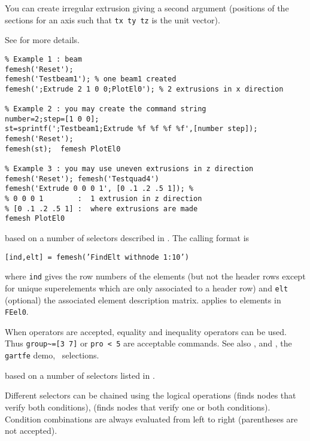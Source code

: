 You can create irregular extrusion giving a second argument (positions of the sections for an axis such that {\tt tx ty tz} is the unit vector).

See  for more details.

\begin{verbatim}
% Example 1 : beam
femesh('Reset');
femesh('Testbeam1'); % one beam1 created
femesh(';Extrude 2 1 0 0;PlotEl0'); % 2 extrusions in x direction

% Example 2 : you may create the command string
number=2;step=[1 0 0];
st=sprintf(';Testbeam1;Extrude %f %f %f %f',[number step]);
femesh('Reset');
femesh(st);  femesh PlotEl0

% Example 3 : you may use uneven extrusions in z direction
femesh('Reset'); femesh('Testquad4')
femesh('Extrude 0 0 0 1', [0 .1 .2 .5 1]); % 
% 0 0 0 1        :  1 extrusion in z direction
% [0 .1 .2 .5 1] :  where extrusions are made
femesh PlotEl0
\end{verbatim}%



 based on a number of selectors described in . The calling format is 

{\tt [ind,elt] = femesh('FindElt withnode 1:10')} 

where {\tt ind} gives the row numbers of the elements (but not the header rows except for unique superelements which are only associated to a header row) and {\tt elt} (optional) the associated element description matrix.  applies to elements in {\tt FEel0}.

When operators are accepted, equality and inequality operators can be used. Thus {\tt group\verb+~=+[3 7]} or {\tt pro < 5} are acceptable commands. See also ,  and , the {\tt gartfe} demo, \fecom\ selections.



 based on a number of selectors listed in . 

Different selectors can be chained using the logical operations \ts{\&} (finds nodes that verify both conditions), \ts{|} (finds nodes that verify one or both conditions). Condition combinations are always evaluated from left to right (parentheses are not accepted).

